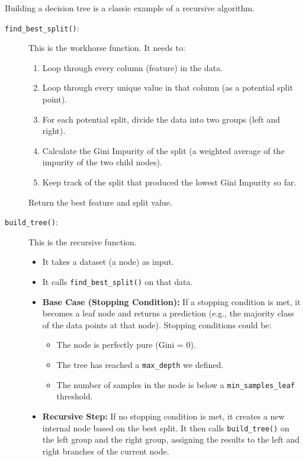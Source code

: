 \documentclass[11pt, letterpaper, openany]{book}
\begin{document}
Building a decision tree is a classic example of a recursive algorithm.

\begin{description}
    \item[\texttt{find\_best\_split()}:] This is the workhorse function. It needs to:
    \begin{enumerate}
        \item Loop through every column (feature) in the data.
        \item Loop through every unique value in that column (as a potential split point).
        \item For each potential split, divide the data into two groups (left and right).
        \item Calculate the Gini Impurity of the split (a weighted average of the impurity of the two child nodes).
        \item Keep track of the split that produced the lowest Gini Impurity so far.
    \end{enumerate}
    Return the best feature and split value.
    \item[\texttt{build\_tree()}:] This is the recursive function.
    \begin{itemize}
        \item It takes a dataset (a node) as input.
        \item It calls \texttt{find\_best\_split()} on that data.
        \item \textbf{Base Case (Stopping Condition):} If a stopping condition is met, it becomes a leaf node and returns a prediction (e.g., the majority class of the data points at that node). Stopping conditions could be:
        \begin{itemize}
            \item The node is perfectly pure (Gini = 0).
            \item The tree has reached a \texttt{max\_depth} we defined.
            \item The number of samples in the node is below a \texttt{min\_samples\_leaf} threshold.
        \end{itemize}
        \item \textbf{Recursive Step:} If no stopping condition is met, it creates a new internal node based on the best split. It then calls \texttt{build\_tree()} on the left group and the right group, assigning the results to the left and right branches of the current node.
    \end{itemize}
\end{description}
\end{document}
